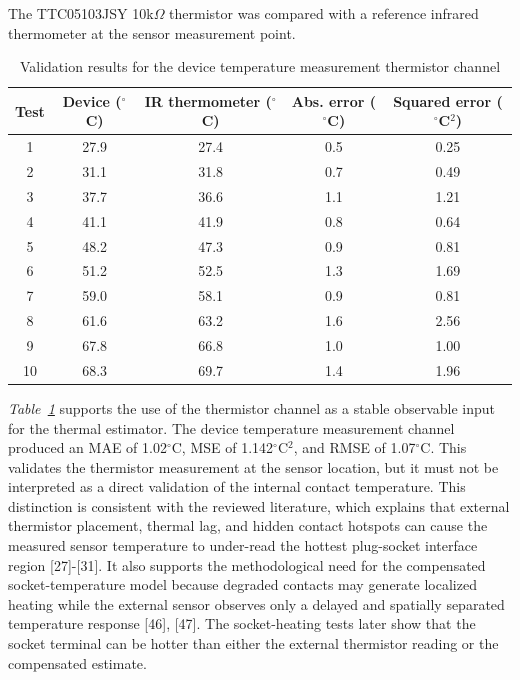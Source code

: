 The TTC05103JSY 10k$\Omega$ thermistor was compared with a reference infrared
thermometer at the sensor measurement point.

\begin{table}[H]
  \centering
  \caption{Validation results for the device temperature measurement thermistor channel}
  \label{tab:ch4-temperature-validation}
  \begin{tabular}{ccccc}
    \toprule
    \textbf{Test} & \textbf{Device ($^\circ$C)} & \textbf{IR thermometer ($^\circ$C)} & \textbf{Abs. error ($^\circ$C)} & \textbf{Squared error ($^\circ$C$^2$)} \\
    \midrule
    1 & 27.9 & 27.4 & 0.5 & 0.25 \\
    2 & 31.1 & 31.8 & 0.7 & 0.49 \\
    3 & 37.7 & 36.6 & 1.1 & 1.21 \\
    4 & 41.1 & 41.9 & 0.8 & 0.64 \\
    5 & 48.2 & 47.3 & 0.9 & 0.81 \\
    6 & 51.2 & 52.5 & 1.3 & 1.69 \\
    7 & 59.0 & 58.1 & 0.9 & 0.81 \\
    8 & 61.6 & 63.2 & 1.6 & 2.56 \\
    9 & 67.8 & 66.8 & 1.0 & 1.00 \\
    10 & 68.3 & 69.7 & 1.4 & 1.96 \\
    \bottomrule
  \end{tabular}
\end{table}

\textit{Table~\ref{tab:ch4-temperature-validation}} supports the use of the
thermistor channel as a stable observable input for the thermal estimator. The
device temperature measurement channel produced an MAE of 1.02$^\circ$C, MSE of
1.142$^\circ$C$^2$, and RMSE of 1.07$^\circ$C. This validates the thermistor
measurement at the sensor location, but it must not be interpreted as a direct
validation of the internal contact temperature. This distinction is consistent
with the reviewed literature, which explains that external thermistor placement,
thermal lag, and hidden contact hotspots can cause the measured sensor
temperature to under-read the hottest plug-socket interface region [27]-[31].
It also supports the methodological need for the compensated socket-temperature
model because degraded contacts may generate localized heating while the
external sensor observes only a delayed and spatially separated temperature
response [46], [47]. The socket-heating tests later show that the socket
terminal can be hotter than either the external thermistor reading or the
compensated estimate.